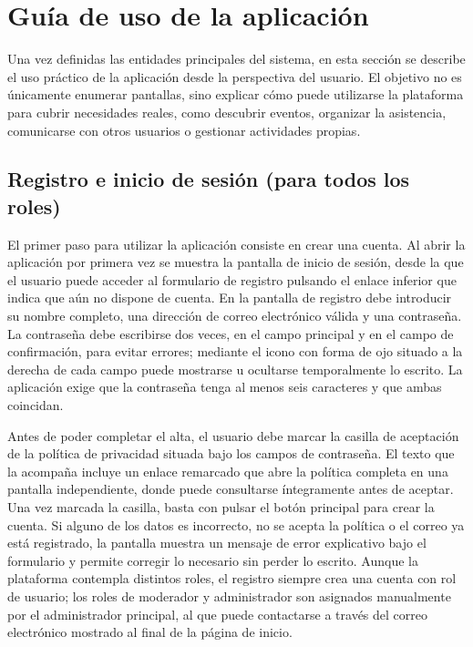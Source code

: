\section{Guía de uso de la aplicación}

Una vez definidas las entidades principales del sistema, en esta sección se describe el uso práctico de la aplicación desde la perspectiva del usuario. El objetivo no es únicamente enumerar pantallas, sino explicar cómo puede utilizarse la plataforma para cubrir necesidades reales, como descubrir eventos, organizar la asistencia, comunicarse con otros usuarios o gestionar actividades propias.

\clearpage

\subsection{Registro e inicio de sesión (para todos los roles)}

El primer paso para utilizar la aplicación consiste en crear una cuenta. Al abrir la aplicación por primera vez se muestra la pantalla de inicio de sesión, desde la que el usuario puede acceder al formulario de registro pulsando el enlace inferior que indica que aún no dispone de cuenta. En la pantalla de registro debe introducir su nombre completo, una dirección de correo electrónico válida y una contraseña. La contraseña debe escribirse dos veces, en el campo principal y en el campo de confirmación, para evitar errores; mediante el icono con forma de ojo situado a la derecha de cada campo puede mostrarse u ocultarse temporalmente lo escrito. La aplicación exige que la contraseña tenga al menos seis caracteres y que ambas coincidan.

Antes de poder completar el alta, el usuario debe marcar la casilla de aceptación de la política de privacidad situada bajo los campos de contraseña. El texto que la acompaña incluye un enlace remarcado que abre la política completa en una pantalla independiente, donde puede consultarse íntegramente antes de aceptar. Una vez marcada la casilla, basta con pulsar el botón principal para crear la cuenta. Si alguno de los datos es incorrecto, no se acepta la política o el correo ya está registrado, la pantalla muestra un mensaje de error explicativo bajo el formulario y permite corregir lo necesario sin perder lo escrito. Aunque la plataforma contempla distintos roles, el registro siempre crea una cuenta con rol de usuario; los roles de moderador y administrador son asignados manualmente por el administrador principal, al que puede contactarse a través del correo electrónico mostrado al final de la página de inicio.

